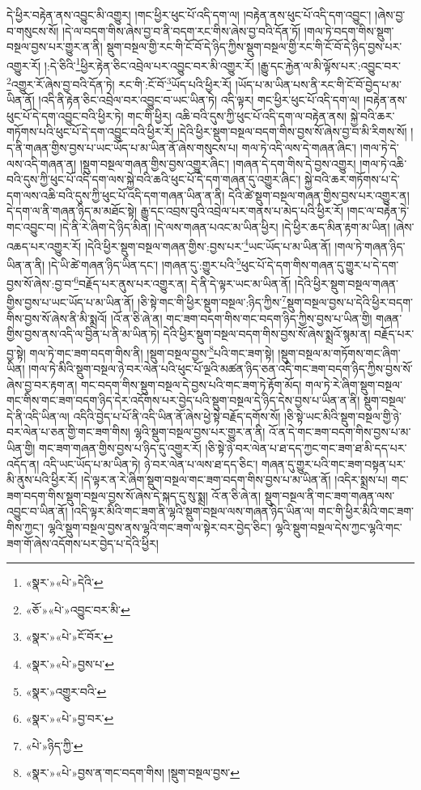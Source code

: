 དེ་ཕྱིར་བརྟེན་ནས་འབྱུང་མི་འགྱུར། །གང་ཕྱིར་ཕུང་པོ་འདི་དག་ལ། །བརྟེན་ནས་ཕུང་པོ་འདི་དག་འབྱུང་། །ཞེས་བྱ་བ་གསུངས་སོ། །དེ་ལ་བདག་གིས་ཞེས་བྱ་བ་ནི་བདག་རང་གིས་ཞེས་བྱ་བའི་དོན་ཏོ། །གལ་ཏེ་བདག་གིས་སྡུག་བསྔལ་བྱས་པར་གྱུར་ན་ནི། སྡུག་བསྔལ་གྱི་རང་གི་ངོ་བོ་དེ་ཉིད་ཀྱིས་སྡུག་བསྔལ་གྱི་རང་གི་ངོ་བོ་དེ་ཉིད་བྱས་པར་འགྱུར་རོ། །:དེ་ཅིའི་\footnote{«སྣར་»«པེ་»དེའི་}ཕྱིར་རྟེན་ཅིང་འབྲེལ་པར་འབྱུང་བར་མི་འགྱུར་རོ། །རྒྱུ་དང་རྐྱེན་ལ་མི་ལྟོས་པར་:འབྱུང་བར་\footnote{«ཅོ་»«པེ་»འབྱུང་བར་མི་}འགྱུར་རོ་ཞེས་བྱ་བའི་དོན་ཏེ། རང་གི་:ངོ་བོ་\footnote{«སྣར་»«པེ་»ངོ་བོར་}ཡོད་པའི་ཕྱིར་རོ། །ཡོད་པ་མ་ཡིན་པས་ནི་རང་གི་ངོ་བོ་བྱེད་པ་མ་ཡིན་ནོ། །འདི་ནི་རྟེན་ཅིང་འབྲེལ་བར་འབྱུང་བ་ཡང་ཡིན་ཏེ། འདི་ལྟར། གང་ཕྱིར་ཕུང་པོ་འདི་དག་ལ། །བརྟེན་ནས་ཕུང་པོ་དེ་དག་འབྱུང་བའི་ཕྱིར་ཏེ། གང་གི་ཕྱིར། འཆི་བའི་དུས་ཀྱི་ཕུང་པོ་འདི་དག་ལ་བརྟེན་ནས། སྐྱེ་བའི་ཆར་གཏོགས་པའི་ཕུང་པོ་དེ་དག་འབྱུང་བའི་ཕྱིར་རོ། །དེའི་ཕྱིར་སྡུག་བསྔལ་བདག་གིས་བྱས་སོ་ཞེས་བྱ་བ་མི་རིགས་སོ། །ད་ནི་གཞན་གྱིས་བྱས་པ་ཡང་ཡོད་པ་མ་ཡིན་ནོ་ཞེས་གསུངས་པ། གལ་ཏེ་འདི་ལས་དེ་གཞན་ཞིང་། །གལ་ཏེ་དེ་ལས་འདི་གཞན་ན། །སྡུག་བསྔལ་གཞན་གྱིས་བྱས་འགྱུར་ཞིང་། །གཞན་དེ་དག་གིས་དེ་བྱས་འགྱུར། །གལ་ཏེ་འཆི་བའི་དུས་ཀྱི་ཕུང་པོ་འདི་དག་ལས་སྐྱེ་བའི་ཆའི་ཕུང་པོ་དེ་དག་གཞན་དུ་འགྱུར་ཞིང་། སྐྱེ་བའི་ཆར་གཏོགས་པ་དེ་དག་ལས་འཆི་བའི་དུས་ཀྱི་ཕུང་པོ་འདི་དག་གཞན་ཡིན་ན་ནི། དེའི་ཚེ་སྡུག་བསྔལ་གཞན་གྱིས་བྱས་པར་འགྱུར་ན། དེ་དག་ལ་ནི་གཞན་ཉིད་མ་མཐོང་སྟེ། རྒྱུ་དང་འབྲས་བུའི་འབྲེལ་པར་གནས་པ་མེད་པའི་ཕྱིར་རོ། །གང་ལ་བརྟེན་ཏེ་གང་འབྱུང་བ། །དེ་ནི་རེ་ཞིག་དེ་ཉིད་མིན། །དེ་ལས་གཞན་པའང་མ་ཡིན་ཕྱིར། །དེ་ཕྱིར་ཆད་མིན་རྟག་མ་ཡིན། །ཞེས་འཆད་པར་འགྱུར་རོ། །དེའི་ཕྱིར་སྡུག་བསྔལ་གཞན་གྱིས་:བྱས་པར་\footnote{«སྣར་»«པེ་»བྱས་པ་}ཡང་ཡོད་པ་མ་ཡིན་ནོ། །གལ་ཏེ་གཞན་ཉིད་ཡིན་ན་ནི། །དེ་ཡི་ཚེ་གཞན་ཉིད་ཡིན་དང་། །གཞན་དུ་:གྱུར་པའི་\footnote{«སྣར་»འགྱུར་བའི་}ཕུང་པོ་དེ་དག་གིས་གཞན་དུ་གྱུར་པ་དེ་དག་བྱས་སོ་ཞེས་:བྱ་བ་\footnote{«སྣར་»«པེ་»བྱ་བར་}བརྗོད་པར་ནུས་པར་འགྱུར་ན། དེ་ནི་དེ་ལྟར་ཡང་མ་ཡིན་ནོ། །དེའི་ཕྱིར་སྡུག་བསྔལ་གཞན་གྱིས་བྱས་པ་ཡང་ཡོད་པ་མ་ཡིན་ནོ། །ཅི་སྟེ་གང་གི་ཕྱིར་སྡུག་བསྔལ་:ཉིད་ཀྱིས་\footnote{«པེ་»ཉིད་ཀྱི་}སྡུག་བསྔལ་བྱས་པ་དེའི་ཕྱིར་བདག་གིས་བྱས་སོ་ཞེས་ནི་མི་སྨྲའོ། །འོ་ན་ཅི་ཞེ་ན། གང་ཟག་བདག་གིས་གང་བདག་ཉིད་ཀྱིས་བྱས་པ་ཡིན་གྱི། གཞན་གྱིས་བྱས་ནས་འདི་ལ་བྱིན་པ་ནི་མ་ཡིན་ཏེ། དེའི་ཕྱིར་སྡུག་བསྔལ་བདག་གིས་བྱས་སོ་ཞེས་སྨྲའོ་སྙམ་ན། བརྗོད་པར་བྱ་སྟེ། གལ་ཏེ་གང་ཟག་བདག་གིས་ནི། །སྡུག་བསྔལ་བྱས་\footnote{«སྣར་»«པེ་»བྱས་ན་གང་བདག་གིས། །སྡུག་བསྔལ་བྱས་}པའི་གང་ཟག་སྟེ། །སྡུག་བསྔལ་མ་གཏོགས་གང་ཞིག་ཡིན། །གལ་ཏེ་མིའི་སྡུག་བསྔལ་ཉེ་བར་ལེན་པའི་ཕུང་པོ་ལྔའི་མཚན་ཉིད་ཅན་འདི་གང་ཟག་བདག་ཉིད་ཀྱིས་བྱས་སོ་ཞེས་བྱ་བར་རྟག་ན། གང་བདག་གིས་སྡུག་བསྔལ་དེ་བྱས་པའི་གང་ཟག་ཏེ་རྟོག་མོད། གལ་ཏེ་རེ་ཞིག་སྡུག་བསྔལ་གང་གིས་གང་ཟག་བདག་ཉིད་དེར་འདོགས་པར་བྱེད་པའི་སྡུག་བསྔལ་དེ་ཉིད་དེས་བྱས་པ་ཡིན་ན་ནི། སྡུག་བསྔལ་དེ་ནི་འདི་ཡིན་ལ། འདིའི་བྱེད་པ་པོ་ནི་འདི་ཡིན་ནོ་ཞེས་ཕྱེ་སྟེ་བརྗོད་དགོས་སོ། །ཅི་སྟེ་ཡང་མིའི་སྡུག་བསྔལ་གྱི་ཉེ་བར་ལེན་པ་ཅན་གྱི་གང་ཟག་གིས། ལྷའི་སྡུག་བསྔལ་བྱས་པར་གྱུར་ན་ནི། འོ་ན་དེ་གང་ཟག་བདག་གིས་བྱས་པ་མ་ཡིན་གྱི། གང་ཟག་གཞན་གྱིས་བྱས་པ་ཉིད་དུ་འགྱུར་རོ། །ཅི་སྟེ་ཉེ་བར་ལེན་པ་ཐ་དད་ཀྱང་གང་ཟག་ཐ་མི་དད་པར་འདོད་ན། འདི་ཡང་ཡོད་པ་མ་ཡིན་ཏེ། ཉེ་བར་ལེན་པ་ལས་ཐ་དད་ཅིང་། གཞན་དུ་གྱུར་པའི་གང་ཟག་བསྟན་པར་མི་ནུས་པའི་ཕྱིར་རོ། །དེ་ལྟར་ན་རེ་ཞིག་སྡུག་བསྔལ་གང་ཟག་བདག་གིས་བྱས་པ་མ་ཡིན་ནོ། །འདིར་སྨྲས་པ། གང་ཟག་བདག་གིས་སྡུག་བསྔལ་བྱས་སོ་ཞེས་དེ་སྐད་དུ་སུ་སྨྲ། འོ་ན་ཅི་ཞེ་ན། སྡུག་བསྔལ་ནི་གང་ཟག་གཞན་ལས་འབྱུང་བ་ཡིན་ནོ། །འདི་ལྟར་མིའི་གང་ཟག་ནི་ལྷའི་སྡུག་བསྔལ་ལས་གཞན་ཉིད་ཡིན་ལ། གང་གི་ཕྱིར་མིའི་གང་ཟག་གིས་ཀྱང་། ལྷའི་སྡུག་བསྔལ་བྱས་ནས་ལྷའི་གང་ཟག་ལ་སྟེར་བར་བྱེད་ཅིང་། ལྷའི་སྡུག་བསྔལ་དེས་ཀྱང་ལྷའི་གང་ཟག་གོ་ཞེས་འདོགས་པར་བྱེད་པ་དེའི་ཕྱིར། 